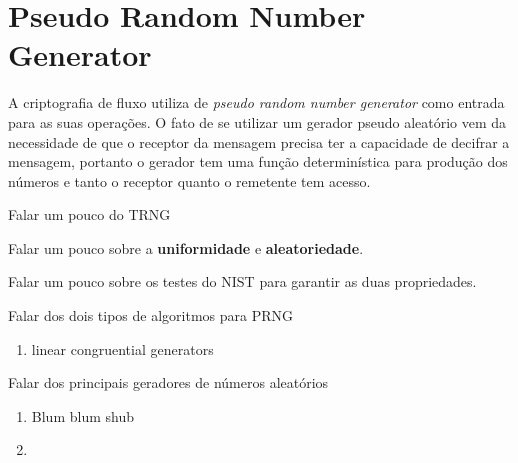 \chapter{Pseudo Random Number Generator}
\label{pseudo-random-number-generator}

% 
A criptografia de fluxo utiliza de \textit{pseudo random number generator} como entrada para as suas operações. O fato de se utilizar um gerador pseudo aleatório vem da necessidade de que o receptor da mensagem precisa ter a capacidade de decifrar a mensagem, portanto o gerador tem uma função determinística para produção dos números e tanto o receptor quanto o remetente tem acesso.

% 
Falar um pouco do TRNG

% 
Falar um pouco sobre a \textbf{uniformidade} e \textbf{aleatoriedade}.

%
Falar um pouco sobre os testes do NIST para garantir as duas propriedades.


Falar dos dois tipos de 	algoritmos para PRNG
\begin{enumerate}
\item linear congruential generators

\end{enumerate}
% 
Falar dos principais geradores de números aleatórios
\begin{enumerate}
\item Blum blum shub
\item
\end{enumerate}
